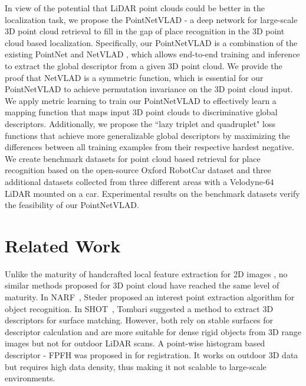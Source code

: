 \documentclass[10pt,twocolumn,letterpaper]{article}
\begin{document}
In view of the potential that LiDAR point clouds could be better in the localization task, we propose the PointNetVLAD - a deep network for large-scale 3D point cloud retrieval to fill in the gap of place recognition in the 3D point cloud based localization. Specifically, our PointNetVLAD
is a combination of the existing PointNet \cite{qi2016pointnet} and NetVLAD \cite{Arandjelovic16}, which allows end-to-end training and inference to extract the global descriptor from a given 3D point cloud. We provide the proof that NetVLAD is a symmetric function, which is essential for our PointNetVLAD to achieve permutation invariance on the 3D point cloud input. We apply metric learning \cite{Chopra:2005} to train our PointNetVLAD to effectively learn a mapping function that maps input 3D point clouds to discriminative global descriptors. Additionally, we propose the ``lazy triplet and quadruplet" loss functions that achieve more generalizable global descriptors by maximizing the differences between all training examples from their respective hardest negative. We create benchmark datasets for point cloud based retrieval for place recognition based on the open-source Oxford RobotCar dataset \cite{RobotCarDatasetIJRR} and three additional datasets collected from three different areas with a Velodyne-64 LiDAR mounted on a car. Experimental results on the benchmark datasets verify the feasibility of our PointNetVLAD.  	\section{Related Work}



Unlike the maturity of handcrafted local feature extraction for 2D images \cite{Lowe:2004,Bay:2008}, no similar methods proposed for 3D point cloud have reached the same level of maturity. 
In NARF~\cite{Steder:2010}, Steder  proposed an interest point extraction algorithm for object recognition. In SHOT~\cite{Tombari:2010}, Tombari   suggested a method to extract 3D descriptors for surface matching. However, both \cite{Steder:2010,Tombari:2010} rely on stable surfaces for descriptor calculation and are more suitable for dense rigid objects from 3D range images but not for outdoor LiDAR scans. A point-wise histogram based descriptor - FPFH was proposed in \cite{Rusu:2009,Radu:2008} for registration. It works on outdoor 3D data but requires high data density, thus making it not scalable to large-scale environments.
\end{document}
